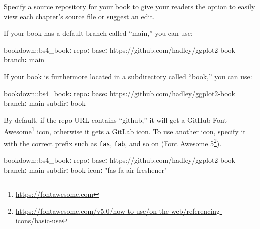 \documentclass[
  12pt,
]{krantz}
\newenvironment{Shaded}{\begin{snugshade}}{\end{snugshade}}
\newcommand{\AttributeTok}[1]{\textcolor[rgb]{0.77,0.63,0.00}{#1}}
\newcommand{\FunctionTok}[1]{\textcolor[rgb]{0.00,0.00,0.00}{#1}}
\newcommand{\KeywordTok}[1]{\textcolor[rgb]{0.13,0.29,0.53}{\textbf{#1}}}
\newcommand{\StringTok}[1]{\textcolor[rgb]{0.31,0.60,0.02}{#1}}
\renewcommand{\href}[2]{#2\footnote{\url{#1}}}
\theoremstyle{definition}
\theoremstyle{definition}
\theoremstyle{definition}
\theoremstyle{definition}
\theoremstyle{remark}
\begin{document}
Specify a source repository for your book to give your readers the option to easily view each chapter's source file or suggest an edit.

If your book has a default branch called ``main,'' you can use:

\begin{Shaded}
\begin{Highlighting}[]
\AttributeTok{bookdown:}\FunctionTok{:bs4\_book}\KeywordTok{:}
\AttributeTok{  }\FunctionTok{repo}\KeywordTok{:}
\AttributeTok{    }\FunctionTok{base}\KeywordTok{:}\AttributeTok{ https://github.com/hadley/ggplot2{-}book}
\AttributeTok{    }\FunctionTok{branch}\KeywordTok{:}\AttributeTok{ main}
\end{Highlighting}
\end{Shaded}

If your book is furthermore located in a subdirectory called ``book,'' you can use:

\begin{Shaded}
\begin{Highlighting}[]
\AttributeTok{bookdown:}\FunctionTok{:bs4\_book}\KeywordTok{:}
\AttributeTok{  }\FunctionTok{repo}\KeywordTok{:}
\AttributeTok{    }\FunctionTok{base}\KeywordTok{:}\AttributeTok{ https://github.com/hadley/ggplot2{-}book}
\AttributeTok{    }\FunctionTok{branch}\KeywordTok{:}\AttributeTok{ main}
\AttributeTok{    }\FunctionTok{subdir}\KeywordTok{:}\AttributeTok{ book}
\end{Highlighting}
\end{Shaded}

By default, if the repo URL contains ``github,'' it will get a GitHub \href{https://fontawesome.com}{Font Awesome} icon, otherwise it gets a GitLab icon.
To use another icon, specify it with the correct prefix such as \texttt{fas}, \texttt{fab}, and so on (\href{https://fontawesome.com/v5.0/how-to-use/on-the-web/referencing-icons/basic-use}{Font Awesome 5}).

\begin{Shaded}
\begin{Highlighting}[]
\AttributeTok{bookdown:}\FunctionTok{:bs4\_book}\KeywordTok{:}
\AttributeTok{  }\FunctionTok{repo}\KeywordTok{:}
\AttributeTok{    }\FunctionTok{base}\KeywordTok{:}\AttributeTok{ https://github.com/hadley/ggplot2{-}book}
\AttributeTok{    }\FunctionTok{branch}\KeywordTok{:}\AttributeTok{ main}
\AttributeTok{    }\FunctionTok{subdir}\KeywordTok{:}\AttributeTok{ book}
\AttributeTok{    }\FunctionTok{icon}\KeywordTok{:}\AttributeTok{ }\StringTok{"fas fa{-}air{-}freshener"}
\end{Highlighting}
\end{Shaded}
\end{document}
